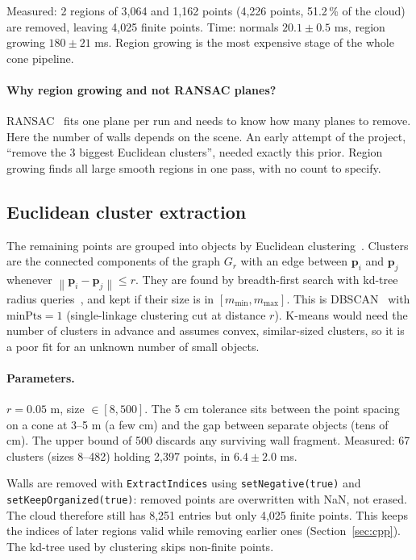 \documentclass[10pt,a4paper]{scrartcl}
\renewcommand{\emph}[1]{\textcolor{accent}{#1}}
\newcommand{\code}[1]{\texttt{#1}}
\newcommand{\norm}[1]{\left\lVert #1 \right\rVert}
\begin{document}
  \emph{Measured:} 2 regions of 3,064 and 1,162 points (4,226 points, 51.2\,\% of
  the cloud) are removed, leaving 4,025 finite points. Time: normals $20.1\pm0.5$ ms,
  region growing $180\pm21$ ms. Region growing is the most expensive stage of the
  whole cone pipeline.

  \paragraph{Why region growing and not RANSAC planes?}
  RANSAC~\citep{fischler1981ransac} fits one plane per run and needs to know how many
  planes to remove. Here the number of walls depends on the scene. An early attempt
  of the project, ``remove the 3 biggest Euclidean clusters'', needed exactly this
  prior. Region growing finds all large smooth regions in one pass, with no count to
  specify.

  \subsection{Euclidean cluster extraction}

  The remaining points are grouped into objects by Euclidean
  clustering~\citep{rusu2009thesis}. Clusters are the connected components of the
  graph $G_r$ with an edge between $\bm p_i$ and $\bm p_j$ whenever
  $\norm{\bm p_i-\bm p_j}\le r$. They are found by breadth-first search with
  kd-tree radius queries~\citep{bentley1975kdtree,muja2014flann}, and kept if their
  size is in $[m_{\min},m_{\max}]$. This is DBSCAN~\citep{ester1996dbscan} with
  $\text{minPts}=1$ (single-linkage clustering cut at distance $r$). K-means would
  need the number of clusters in advance and assumes convex, similar-sized clusters,
  so it is a poor fit for an unknown number of small objects.

  \paragraph{Parameters.} $r=0.05$ m, size $\in[8,500]$. The 5 cm tolerance sits
  between the point spacing on a cone at 3--5 m (a few cm) and the gap between
  separate objects (tens of cm). The upper bound of 500 discards any surviving wall
  fragment. \emph{Measured:} 67 clusters (sizes 8--482) holding 2,397 points, in
  $6.4\pm2.0$ ms.

  \begin{warnbox}
  \small
  Walls are removed with \code{ExtractIndices} using \code{setNegative(true)} and
  \code{setKeepOrganized(true)}: removed points are overwritten with NaN, not erased.
  The cloud therefore still has 8,251 entries but only 4,025 finite points. This keeps
  the indices of later regions valid while removing earlier ones (Section~\ref{sec:cpp}).
  The kd-tree used by clustering skips non-finite points.
  \end{warnbox}
\end{document}
